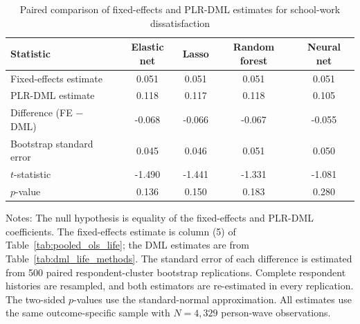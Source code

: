 \begin{table}[!htbp]
\centering
\caption{Paired comparison of fixed-effects and PLR-DML estimates for school-work dissatisfaction}
\label{tab:fe_plr_comparison_schoolwork_dissatisfaction}
\small
\setlength{\tabcolsep}{5pt}
\begin{tabular}{lcccc}
\hline
Statistic & Elastic net & Lasso & Random forest & Neural net
\\
\hline
Fixed-effects estimate & 0.051 & 0.051 & 0.051 & 0.051
\\
PLR-DML estimate & 0.118 & 0.117 & 0.118 & 0.105
\\
Difference (FE $-$ DML) & -0.068 & -0.066 & -0.067 & -0.055
\\
Bootstrap standard error & 0.045 & 0.046 & 0.051 & 0.050
\\
$t$-statistic & -1.490 & -1.441 & -1.331 & -1.081
\\
$p$-value & 0.136 & 0.150 & 0.183 & 0.280
\\
\hline
\end{tabular}
\begin{minipage}{0.96\textwidth}
\footnotesize Notes: The null hypothesis is equality of the fixed-effects and PLR-DML coefficients. The fixed-effects estimate is column (5) of Table~\ref{tab:pooled_ols_life}; the DML estimates are from Table~\ref{tab:dml_life_methods}. The standard error of each difference is estimated from 500 paired respondent-cluster bootstrap replications. Complete respondent histories are resampled, and both estimators are re-estimated in every replication. The two-sided $p$-values use the standard-normal approximation. All estimates use the same outcome-specific sample with $N=4,329$ person-wave observations.
\end{minipage}
\end{table}
